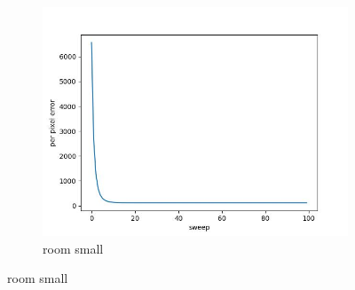 \documentclass[11pt]{article}
\begin{document}
\begin{figure}[ht!]
\begin{subfigure}[]{0.333\linewidth}
        \includegraphics[width=\linewidth]{fig/loss/room_small_loss.jpg}
        \caption{room small}
    \end{subfigure}%
\end{figure}
\end{document}
